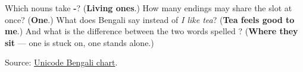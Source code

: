 \begin{tcolorbox}[breakable,colback=teal!4,colframe=teal!35!black,title={Before you move on}]
Which nouns take \textbf{-}? (\textbf{Living ones}.) How many endings may share the slot at once? (\textbf{One}.) What does Bengali say instead of \emph{I like tea}? (\textbf{Tea feels good to me}.) And what is the difference between the two words spelled \textbf{}? (\textbf{Where they sit} — one is stuck on, one stands alone.)

Source: \href{https://www.unicode.org/charts/PDF/U0980.pdf}{Unicode Bengali chart}.
\end{tcolorbox}
